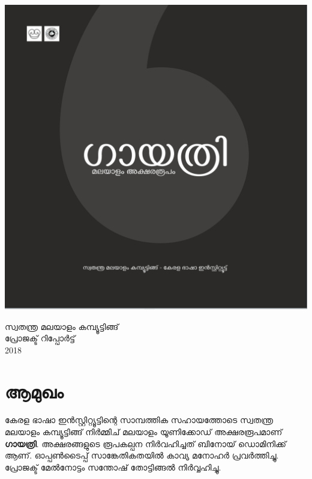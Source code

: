 \documentclass[12pt]{report}
\begin{document}
	
\begin{titlepage}
	\pagecolor{offwhite}\afterpage{\nopagecolor}
	\begin{center}
		\begin{centering}
		\includegraphics[width=\textwidth]{title.png}\\[0.5cm]	
		\end
		{centering}
		

		\textsc{\Large {സ്വതന്ത്ര മലയാളം കമ്പ്യൂട്ടിങ്ങ്}}~\\
		
		{\textsc{\Large {പ്രോജക്ട് റിപ്പോര്‍ട്ട്}}}\\
		2018
	\end{center}
\end{titlepage}
 

\thispagestyle{empty}	
\clearpage
	
	\chapter*{ആമുഖം}
	

	കേരള ഭാഷാ ഇന്‍സ്റ്റിറ്റ്യൂട്ടിന്റെ സാമ്പത്തിക സഹായത്തോടെ സ്വതന്ത്ര മലയാളം കമ്പ്യൂട്ടിങ്ങ് നിര്‍മ്മിച് മലയാളം യൂണിക്കോഡ് അക്ഷരരൂപമാണ്  \textbf{ഗായത്രി}. അക്ഷരങ്ങളുടെ  രൂപകല്പന നിർവഹിച്ചത് ബിനോയ് ഡൊമിനിക്ക് ആണ്. ഓപ്പണ്‍ടൈപ്പ് സാങ്കേതികതയിൽ കാവ്യ മനോഹർ പ്രവർത്തിച്ചു. പ്രോജക്ട് മേല്‍നോട്ടം സന്തോഷ് തോട്ടിങ്ങൽ നിർവ്വഹിച്ചു.
	
\end{document}
